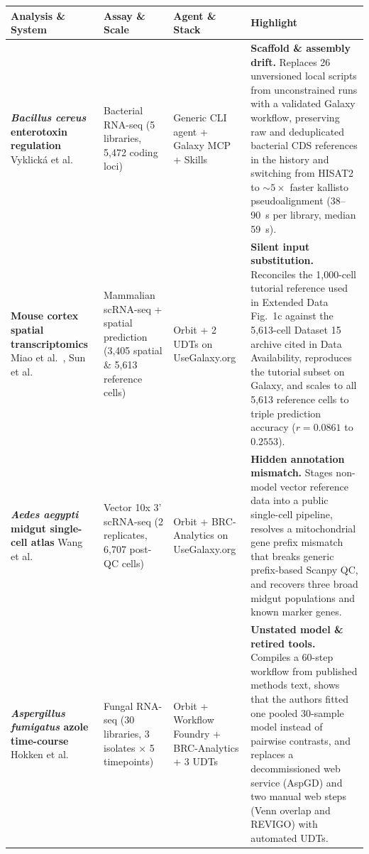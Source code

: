 \documentclass[11pt,letterpaper]{article}
\newcommand{\tool}[1]{\textsf{#1}}
\begin{document}
\begin{table}[!htbp]
\centering
\scriptsize
\setlength{\tabcolsep}{4.5pt}
\renewcommand{\arraystretch}{1.18}
\begin{tabularx}{\textwidth}{p{2.9cm}p{2.3cm}p{2.3cm}X}
\toprule
\textbf{Analysis \& System} & \textbf{Assay \& Scale} & \textbf{Agent \& Stack} & \textbf{Highlight} \\
\midrule
\textbf{\textit{Bacillus cereus} enterotoxin regulation} \newline Vyklick{\'a} et al.\ \cite{vyklicka2026} & Bacterial RNA-seq \newline (5 libraries, 5,472 coding loci) & Generic CLI agent + Galaxy MCP + Skills & \textbf{Scaffold \& assembly drift.} Replaces 26 unversioned local scripts from unconstrained runs with a validated Galaxy workflow, preserving raw and deduplicated bacterial CDS references in the history and switching from \tool{HISAT2} to $\sim 5\times$ faster \tool{kallisto} pseudoalignment (38--90~s per library, median 59~s). \\
\addlinespace[0.35em]
\textbf{Mouse cortex spatial transcriptomics} \newline Miao et al.\ \cite{miao2026}, Sun et al.\ \cite{sun2024} & Mammalian scRNA-seq + spatial prediction \newline (3,405 spatial \& 5,613 reference cells) & \tool{Orbit} + 2 UDTs on UseGalaxy.org & \textbf{Silent input substitution.} Reconciles the 1,000-cell tutorial reference used in Extended Data Fig.~1c against the 5,613-cell Dataset 15 archive cited in Data Availability, reproduces the tutorial subset on Galaxy, and scales to all 5,613 reference cells to triple prediction accuracy ($r = 0.0861$ to $0.2553$). \\
\addlinespace[0.35em]
\textbf{\textit{Aedes aegypti} midgut single-cell atlas} \newline Wang et al.\ \cite{wang2024} & Vector 10x 3' scRNA-seq \newline (2 replicates, 6,707 post-QC cells) & \tool{Orbit} + \tool{BRC-Analytics} on UseGalaxy.org & \textbf{Hidden annotation mismatch.} Stages non-model vector reference data into a public single-cell pipeline, resolves a mitochondrial gene prefix mismatch that breaks generic prefix-based \tool{Scanpy} QC, and recovers three broad midgut populations and known marker genes. \\
\addlinespace[0.35em]
\textbf{\textit{Aspergillus fumigatus} azole time-course} \newline Hokken et al.\ \cite{hokken2018} & Fungal RNA-seq \newline (30 libraries, 3 isolates $\times$ 5 timepoints) & \tool{Orbit} + \tool{Workflow Foundry} + \tool{BRC-Analytics} + 3 UDTs & \textbf{Unstated model \& retired tools.} Compiles a 60-step workflow from published methods text, shows that the authors fitted one pooled 30-sample model instead of pairwise contrasts, and replaces a decommissioned web service (AspGD) and two manual web steps (Venn overlap and \tool{REVIGO}) with automated UDTs. \\

\end{tabularx}
\end{table}
\end{document}
